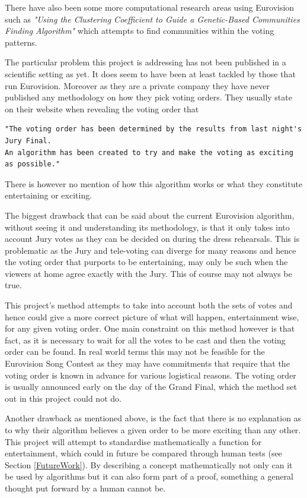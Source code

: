 \documentclass[12pt]{report}
\begin{document}
There have also been some more computational research areas using Eurovision such as \textit{"Using the Clustering Coefficient to Guide a Genetic-Based Communities Finding Algorithm"}\cite{Bello2011} which attempts to find communities within the voting patterns.

The particular problem this project is addressing has not been published in a scientific setting as yet. It does seem to have been at least tackled by those that run Eurovision. Moreover as they are a private company they have never published any methodology on how they pick voting orders. They usually state on their website\cite{votingOrderQuote} when revealing the voting order that 
\begin{verbatim}"The voting order has been determined by the results from last night's Jury Final.
An algorithm has been created to try and make the voting as exciting as possible."
\end{verbatim}
There is however no mention of how this algorithm works or what they constitute entertaining or exciting.

The biggest drawback that can be said about the current Eurovision algorithm, without seeing it and understanding its methodology, is that it only takes into account Jury votes as they can be decided on during the dress rehearsals. This is problematic as the Jury and tele-voting can diverge for many reasons and hence the voting order that purports to be entertaining, may only be such when the viewers at home agree exactly with the Jury. This of course may not always be true.

This project's method attempts to take into account both the sets of votes and hence could give a more correct picture of what will happen, entertainment wise, for any given voting order. One main constraint on this method however is that fact, as it is necessary to wait for all the votes to be cast and then the voting order can be found. In real world terms this may not be feasible for the Eurovision Song Contest as they may have commitments that require that the voting order is known in advance for various logistical reasons. The voting order is usually announced early on the day of the Grand Final, which the method set out in this project could not do.\cite{votingOrderQuote}

Another drawback as mentioned above, is the fact that there is no explanation as to why their algorithm believes a given order to be more exciting than any other. This project will attempt to standardise mathematically a function for entertainment, which could in future be compared through human tests (see Section  \ref{FutureWork}). By describing a concept mathematically not only can it be used by algorithms but it can also form part of a proof, something a general thought put forward by a human cannot be.
\end{document}
